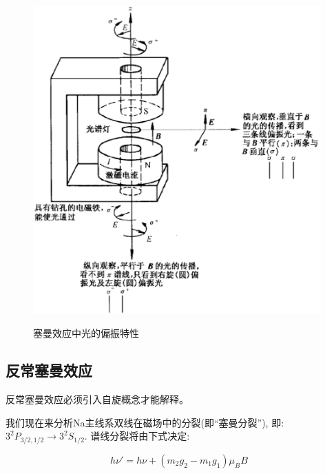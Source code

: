 \begin{figure}[h]
\begin{center}
  \includegraphics[width=11cm]{Spectrum/zeeman_polarized.ps}\\
  \caption{塞曼效应中光的偏振特性}\label{Polarized light in Zeeman effect}
\end{center}
\end{figure}


\subsection{反常塞曼效应}

反常塞曼效应必须引入自旋概念才能解释。

我们现在来分析Na主线系双线在磁场中的分裂(即``塞曼分裂''), 即:
$3^2P_{3/2,1/2} \to 3^2S_{1/2}$. 谱线分裂将由下式决定:


\begin{equation*}
h \nu' = h \nu + (m_2 g_2 - m_1 g_1) \mu_B B
\end{equation*}


